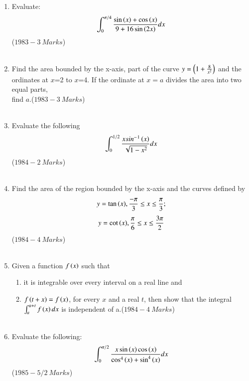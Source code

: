 \documentclass[journal]{IEEEtran}
\begin{document}
\begin{enumerate}
    \item Evaluate:\begin{align*}
         \int_{0}^{\pi/4}\frac{\sin{\ensuremath{\left(x\right)}}+\cos{\ensuremath{\left(x\right)}}}{9+16\sin{\ensuremath{\left(2x\right)}}}dx\end{align*} \hfill($1983-3\ Marks$)\\\\
	 \item Find the area bounded by the x-axis, part of the curve $y=\left(1+\frac{8}{x^2}\right)$ and the ordinates at $x$=2 to $x$=4. If the ordinate at $x=a$ divides the area into two equal parts,\\ find $a$.\hfill($1983-3\ Marks$)\\\\
	 \item Evaluate the following\begin{align*}
	     \int_{0}^{1/2}\frac{xsin^-{}^1\left(x\right)}{\sqrt{1-x^2}}dx
	     \end{align*}\hfill($1984-2\ Marks$)\\\\
     \item Find the area of the region bounded by the x-axis and the curves defined by \begin{align*}y=\tan{\ensuremath{\left(x\right)}}, \frac{-\pi}{3}\leq x \leq\frac{\pi}{3};\end{align*}\begin{align*}y=\cot{\ensuremath{\left(x\right)}}, \frac{\pi}{6}\leq x \leq\frac{3\pi}{2}\end{align*}\hfill($1984-4\ Marks$)\\\\
	     \item Given a function $f\left(x\right)$ such that
		     \begin{enumerate}
			     \item it is integrable over every interval on a real line and
		     \item $f\left(t+x\right)=f\left(x\right)$, for every $x$ and a real $t$, then show that the integral$\int_{a}^{a+t}f\left(x\right) dx$ is independent of a.\hfill($1984-4\ Marks$)\\\\
		     \end{enumerate}
	     \item Evaluate the following:\begin{align*}
	         \int_{0}^{\pi/2}\frac{x\sin{\ensuremath{\left(x
		     \right)}}\cos{\ensuremath{\left(x\right)}}}{\cos^4{\left(x\right)}+\sin^4{\left(x\right)}}dx
		     \end{align*}\hfill($1985-5/2\ Marks$)\\\\

\end{enumerate}
\end{document}
